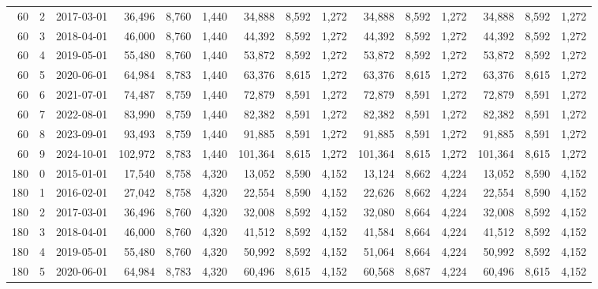 \begin{longtable}{r r l r r r r r r r r r r r r}
60 & 2 & 2017-03-01 & 36{,}496 & 8{,}760 & 1{,}440 & 34{,}888 & 8{,}592 & 1{,}272 & 34{,}888 & 8{,}592 & 1{,}272 & 34{,}888 & 8{,}592 & 1{,}272 \\
60 & 3 & 2018-04-01 & 46{,}000 & 8{,}760 & 1{,}440 & 44{,}392 & 8{,}592 & 1{,}272 & 44{,}392 & 8{,}592 & 1{,}272 & 44{,}392 & 8{,}592 & 1{,}272 \\
60 & 4 & 2019-05-01 & 55{,}480 & 8{,}760 & 1{,}440 & 53{,}872 & 8{,}592 & 1{,}272 & 53{,}872 & 8{,}592 & 1{,}272 & 53{,}872 & 8{,}592 & 1{,}272 \\
60 & 5 & 2020-06-01 & 64{,}984 & 8{,}783 & 1{,}440 & 63{,}376 & 8{,}615 & 1{,}272 & 63{,}376 & 8{,}615 & 1{,}272 & 63{,}376 & 8{,}615 & 1{,}272 \\
60 & 6 & 2021-07-01 & 74{,}487 & 8{,}759 & 1{,}440 & 72{,}879 & 8{,}591 & 1{,}272 & 72{,}879 & 8{,}591 & 1{,}272 & 72{,}879 & 8{,}591 & 1{,}272 \\
60 & 7 & 2022-08-01 & 83{,}990 & 8{,}759 & 1{,}440 & 82{,}382 & 8{,}591 & 1{,}272 & 82{,}382 & 8{,}591 & 1{,}272 & 82{,}382 & 8{,}591 & 1{,}272 \\
60 & 8 & 2023-09-01 & 93{,}493 & 8{,}759 & 1{,}440 & 91{,}885 & 8{,}591 & 1{,}272 & 91{,}885 & 8{,}591 & 1{,}272 & 91{,}885 & 8{,}591 & 1{,}272 \\
60 & 9 & 2024-10-01 & 102{,}972 & 8{,}783 & 1{,}440 & 101{,}364 & 8{,}615 & 1{,}272 & 101{,}364 & 8{,}615 & 1{,}272 & 101{,}364 & 8{,}615 & 1{,}272 \\
\midrule
180 & 0 & 2015-01-01 & 17{,}540 & 8{,}758 & 4{,}320 & 13{,}052 & 8{,}590 & 4{,}152 & 13{,}124 & 8{,}662 & 4{,}224 & 13{,}052 & 8{,}590 & 4{,}152 \\
180 & 1 & 2016-02-01 & 27{,}042 & 8{,}758 & 4{,}320 & 22{,}554 & 8{,}590 & 4{,}152 & 22{,}626 & 8{,}662 & 4{,}224 & 22{,}554 & 8{,}590 & 4{,}152 \\
180 & 2 & 2017-03-01 & 36{,}496 & 8{,}760 & 4{,}320 & 32{,}008 & 8{,}592 & 4{,}152 & 32{,}080 & 8{,}664 & 4{,}224 & 32{,}008 & 8{,}592 & 4{,}152 \\
180 & 3 & 2018-04-01 & 46{,}000 & 8{,}760 & 4{,}320 & 41{,}512 & 8{,}592 & 4{,}152 & 41{,}584 & 8{,}664 & 4{,}224 & 41{,}512 & 8{,}592 & 4{,}152 \\
180 & 4 & 2019-05-01 & 55{,}480 & 8{,}760 & 4{,}320 & 50{,}992 & 8{,}592 & 4{,}152 & 51{,}064 & 8{,}664 & 4{,}224 & 50{,}992 & 8{,}592 & 4{,}152 \\
180 & 5 & 2020-06-01 & 64{,}984 & 8{,}783 & 4{,}320 & 60{,}496 & 8{,}615 & 4{,}152 & 60{,}568 & 8{,}687 & 4{,}224 & 60{,}496 & 8{,}615 & 4{,}152 \\

\end{longtable}
